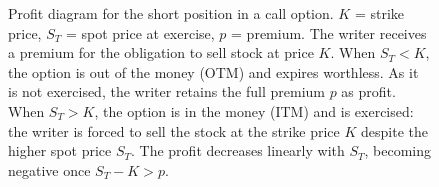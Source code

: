 \documentclass[english,12pt,a4paper,pdftex,sci,utf8]{aaltothesis}
\begin{document}
\begin{center}
\begin{figure}[H]
\centering
  
    \caption{Profit diagram for the short position in a call option. $K$ = strike price, $S_T$ = spot price at exercise, $p$ = premium. The writer receives a premium for the obligation to sell stock at price $K$. When $S_T < K$, the option is out of the money (OTM) and expires worthless. As it is not exercised, the writer retains the full premium $p$ as profit. When $S_T > K$, the option is in the money (ITM) and is exercised: the writer is forced to sell the stock at the strike price $K$ despite the higher spot price $S_T$. The profit decreases linearly with $S_T$, becoming negative once $S_T - K > p$.}

    \label{fig:short_call_payoff}
\end{figure}
\end{center}
\end{document}
